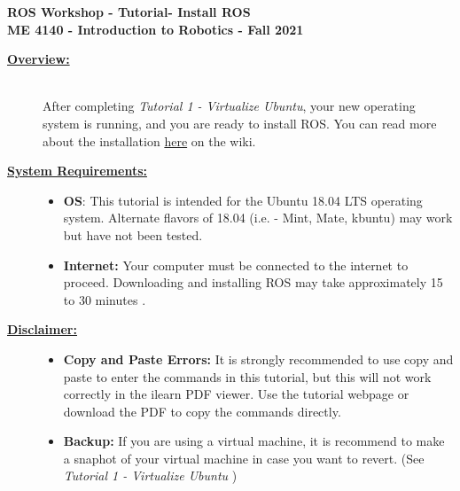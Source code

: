 \documentclass[12pt]{article}
\newcommand{\MNUM}{2} %
\newcommand{\MNAME}{Install ROS} %
\begin{document}
\thispagestyle{plain}

\begin{center}
   {\bf \Large ROS Workshop - Tutorial\hspc\MNUM\hspc - \MNAME}\vspace{3mm}\\
   {\bf \large ME 4140 - Introduction to Robotics - Fall 2021} \vspace{5mm}\\
\end{center}

\begin{description}

\item[\textbf{\underline{Overview:}}] \hfill \vspace{3mm}\\
After completing {\it Tutorial 1 - Virtualize Ubuntu}, your new operating system is running, and you are ready to install ROS. You can read more about the installation \href{http://wiki.ros.org/melodic/Installation/Ubuntu}{here} on the wiki.

\item[\textbf{\underline{System Requirements:}}] \hfill \vspace{0mm}

\begin{itemize}
	\item {\bf OS}: This tutorial is intended for the Ubuntu 18.04 LTS operating system. Alternate flavors of 18.04 (i.e. - Mint, Mate, kbuntu) may work but have not been tested.
	\item {\bf Internet:} Your computer must be connected to the internet to proceed. Downloading and installing ROS may take approximately 15 to 30 minutes .


\end{itemize}

\item[\textbf{\underline{Disclaimer:}}] \hfill \vspace{0mm}

\begin{itemize}
	\item {\bf Copy and Paste Errors:}  It is strongly recommended to use copy and paste to enter the commands in this tutorial, but {\RD this will not work correctly in the ilearn PDF viewer}. Use the tutorial webpage or download the PDF to copy the commands directly.

	\item {\bf Backup: } If you are using a virtual machine, it is recommend to make a snaphot of your virtual machine in case you want to revert. (See {\it Tutorial 1 - Virtualize Ubuntu }) 
\end{itemize}


\end{description}
\end{document}
